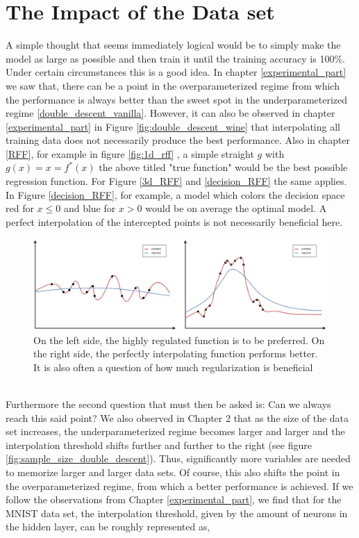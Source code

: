 \section{The Impact of the Data set}
    \label{The Impact of the Dataset}
A simple thought that seems immediately logical would be to simply make the model as large as possible and then train it until the training accuracy is 100\%. Under certain circumstances this is a good idea. In chapter \ref{experimental_part} we saw that, there can be a point in the overparameterized regime from which the performance is always better than the sweet spot in the underparameterized regime \ref{double_descent_vanilla}. However, it can also be observed in chapter \ref{experimental_part} in Figure \ref{fig:double_descent_wine} that interpolating all training data does not necessarily produce the best performance. Also in chapter \ref{RFF}, for example in figure \ref{fig:1d_rff} , a simple straight $g$ with $g(x) = x = f^*(x)$ the above titled "true function" would be the best possible regression function. For Figure \ref{3d_RFF} and \ref{decision_RFF} the same applies. In Figure \ref{decision_RFF}, for example, a model which colors the decision space red for $x \leq 0$ and blue for $x > 0$ would be on average the optimal model. A perfect interpolation of the intercepted points is not necessarily beneficial here.   
\begin{figure}[!htp]
\centering
\includegraphics[width= 1\linewidth]{Abschlussarbeit_2021/LaTeX/images/good_baad_to_overfitt.drawio (2).png}
\caption{On the left side, the highly regulated function is to be preferred. On the right side, the perfectly interpolating function performs better. It is also often a question of how much regularization is beneficial}
\end{figure}
\\
Furthermore the second question that must then be asked is: Can we always reach this said point? We also observed in Chapter 2 that as the size of the data set increases, the underparameterized regime becomes larger and larger and the interpolation threshold shifts further and further to the right (see figure \ref{fig:sample_size_double_descent}). Thus, significantly more variables are needed to memorize larger and larger data sets. Of course, this also shifts the point in the overparameterized regime, from which a better performance is achieved. If we follow the observations from Chapter \ref{experimental_part}, we find that for the MNIST data set, the interpolation threshold, given by the amount of neurons in the hidden layer, can be roughly represented as,

